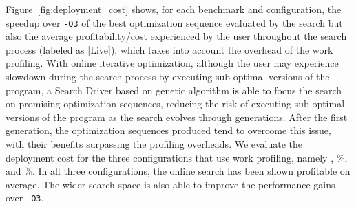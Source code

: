 Figure~\ref{fig:deployment_cost} shows, for each benchmark and configuration, the speedup over \texttt{-O3} of the best optimization sequence
evaluated by the search but also the average profitability/cost experienced by the user throughout the search process (labeled as [Live]),
which takes into account the overhead of the work profiling.
With online iterative optimization, although the 
user may experience slowdown during the search process by executing sub-optimal versions of the program,
a Search Driver based on genetic algorithm is able to focus the search on promising optimization sequences, reducing the risk of
executing sub-optimal versions of the program as the search evolves through generations.
After the first generation, the optimization sequences produced tend to overcome this issue, with their benefits surpassing the profiling overheads.
We evaluate the deployment cost for the three configurations that use work profiling, namely \OptProf, \%, and \%.
In all three configurations, the online search has been shown profitable on average.
The wider search space is also able to improve the performance gains over \texttt{-O3}.
